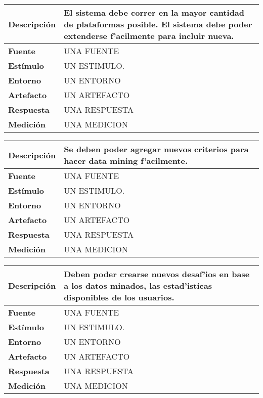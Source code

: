 \begin{center}
  \begin{tabular}{| l | p{10cm} | }
    \hline
  \textbf{Descripción} & El sistema debe correr en la mayor cantidad de plataformas posible. El sistema debe poder extenderse f'acilmente para incluir nueva.\\  \hline
  \textbf{Fuente} & UNA FUENTE\\  \hline
  \textbf{Estímulo} & UN ESTIMULO.\\  \hline
  \textbf{Entorno} & UN ENTORNO\\  \hline
  \textbf{Artefacto} & UN ARTEFACTO\\  \hline
  \textbf{Respuesta} & UNA RESPUESTA\\  \hline
  \textbf{Medición} & UNA MEDICION\\  \hline
  \end{tabular}
\end{center} 

\begin{center}
  \begin{tabular}{| l | p{10cm} | }
    \hline
  \textbf{Descripción} & Se deben poder agregar nuevos criterios para hacer data mining f'acilmente.\\  \hline
  \textbf{Fuente} & UNA FUENTE\\  \hline
  \textbf{Estímulo} & UN ESTIMULO.\\  \hline
  \textbf{Entorno} & UN ENTORNO\\  \hline
  \textbf{Artefacto} & UN ARTEFACTO\\  \hline
  \textbf{Respuesta} & UNA RESPUESTA\\  \hline
  \textbf{Medición} & UNA MEDICION\\  \hline
  \end{tabular}
\end{center} 

\begin{center}
  \begin{tabular}{| l | p{10cm} | }
    \hline
  \textbf{Descripción} & Deben poder crearse nuevos desaf'ios en base a los datos minados, las estad'isticas disponibles de los usuarios.\\  \hline
  \textbf{Fuente} & UNA FUENTE\\  \hline
  \textbf{Estímulo} & UN ESTIMULO.\\  \hline
  \textbf{Entorno} & UN ENTORNO\\  \hline
  \textbf{Artefacto} & UN ARTEFACTO\\  \hline
  \textbf{Respuesta} & UNA RESPUESTA\\  \hline
  \textbf{Medición} & UNA MEDICION\\  \hline
  \end{tabular}
\end{center} 

